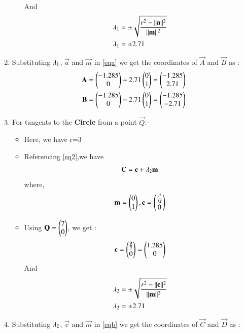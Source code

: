 \documentclass[journal,12pt,twocolumn]{IEEEtran}
\begin{document}
\begin{enumerate}
\begin{itemize}
\begin{align}
\end{align}
And
\begin{align}
\lambda\textsubscript{1} &= \pm\sqrt{\frac{r^2-\norm{\vec{a}}^2}{\norm{\vec{m}}^2}}
\\
\lambda\textsubscript{1} &= \pm 2.71
\end{align}
\end{itemize}
\item Substituting $\lambda\textsubscript{1}$, $\vec{a}$ and $\vec{m}$ in \eqref{eqa} we get the coordinates of $\vec{A}$ and  $\vec{B}$ as :
\begin{align}
\vec{A}&=\myvec{-1.285\\0}+ 2.71\myvec{0\\1}=\myvec{-1.285\\2.71}
\\
\vec{B}&=\myvec{-1.285\\0}- 2.71\myvec{0\\1}=\myvec{-1.285\\-2.71}
\end{align}
\item For tangents to the \textbf{Circle} from a point $\vec{Q}$:-
\begin{itemize}
\item Here, we have r=3
\item Referencing \eqref{eq2},we have
\begin{align}
 \vec{C}=\vec{c}+\lambda\textsubscript{2} \vec{m}   \label{eqb}
\end{align}
where,
\begin{align}
 \vec{m}=\myvec{0\\1},\vec{c}=\myvec{\frac{r^2}{M}\\0}
 \end{align}
 \item Using $\vec{Q}=\myvec{7\\0}$, we get :
 \begin{align}
 \vec{c}=\myvec{\frac{9}{7}\\0}=\myvec{1.285\\0}
\end{align}
And
\begin{align}
\lambda\textsubscript{2} &= \pm\sqrt{\frac {r^2-\norm{\vec{c}}^2}{\norm{\vec{m}}^2}}
\\
\lambda\textsubscript{2} &=\pm 2.71
\end{align}
\end{itemize}
\item Substituting $\lambda\textsubscript{2}$, $\vec{c}$ and $\vec{m}$ in \eqref{eqb} we get the coordinates of $\vec{C}$ and  $\vec{D}$ as :

\end{enumerate}
\end{document}
